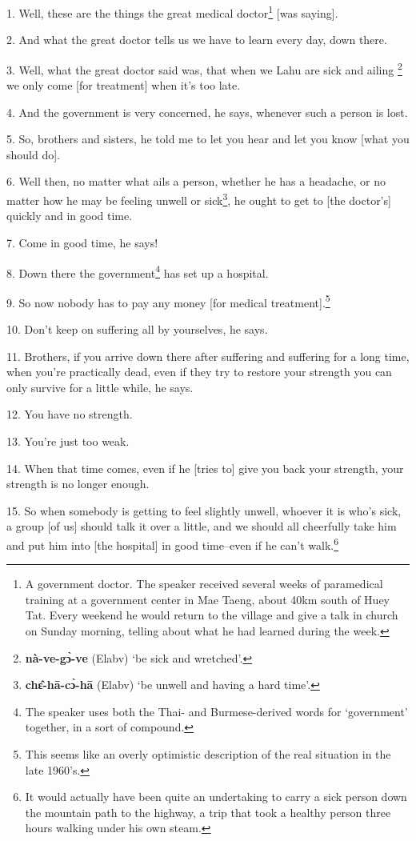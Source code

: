 \setcounter{footnote}{0}


1. Well, these are the things the great medical doctor\footnote{A government doctor. The speaker received several weeks of paramedical training at a government center in Mae Taeng, about 40km south of Huey Tat. Every weekend he would return to the village and give a talk in church on Sunday morning, telling about what he had learned during the week.} [was saying].

2. And what the great doctor tells us we have to learn every day, down there.

3. Well, what the great doctor said was, that when we Lahu are sick and ailing
\footnote{\textbf{nà-ve-gɔ̀-ve} (Elabv) `be sick and wretched'.} we only come [for treatment] when it's too late.

4. And the government is very concerned, he says, whenever such a person is lost.

5. So, brothers and sisters, he told me to let you hear and let you know [what
you should do].

6. Well then, no matter what ails a person, whether he has a headache, or no matter
how he may be feeling unwell or sick\footnote{\textbf{chɛ̂-hā-cɔ̀-hā} (Elabv) `be unwell and having a hard time'.}, he ought to get to [the doctor's] quickly
and in good time.

7. Come in good time, he says!

8. Down there the government\footnote{The speaker uses both the Thai- and Burmese-derived words for `government' together, in a sort of compound.} has set up a hospital.

9. So now nobody has to pay any money [for medical treatment].\footnote{This seems like an overly optimistic description of the real situation in the late 1960's.}

10. Don't keep on suffering all by yourselves, he says.

11. Brothers, if you arrive down there after suffering and suffering for a long
time, when you're practically dead, even if they try to restore your strength you
can only survive for a little while, he says.

12. You have no strength.

13. You're just too weak.

14. When that time comes, even if he [tries to] give you back your strength, your
strength is no longer enough.

15. So when somebody is getting to feel slightly unwell, whoever it is who's sick,
a group [of us] should talk it over a little, and we should all cheerfully take
him and put him into [the hospital] in good time--even if he can't walk.\footnote{It would actually have been quite an undertaking to carry a sick person down the mountain path to the highway, a trip that took a healthy person three hours walking under his own steam.}


